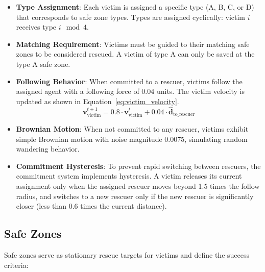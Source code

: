 \documentclass[11pt,a4paper]{article}
\begin{document}
\begin{itemize}
    \item \textbf{Type Assignment}: Each victim is assigned a specific type (A, B, C, or D) that corresponds to safe zone types.
    Types are assigned cyclically: victim $i$ receives type $i \mod 4$.

    \item \textbf{Matching Requirement}: Victims must be guided to their matching safe zones to be considered rescued.
    A victim of type A can only be saved at the type A safe zone.

    \item \textbf{Following Behavior}: When committed to a rescuer, victims follow the assigned agent with a following force of 0.04 units.
    The victim velocity is updated as shown in Equation~\ref{eq:victim_velocity}.
    \begin{equation}
    \label{eq:victim_velocity}
    \mathbf{v}_{\text{victim}}^{t+1} = 0.8 \cdot \mathbf{v}_{\text{victim}}^{t} + 0.04 \cdot \hat{\mathbf{d}}_{\text{to\_rescuer}}
    \end{equation}

    \item \textbf{Brownian Motion}: When not committed to any rescuer, victims exhibit simple Brownian motion with noise magnitude 0.0075, simulating random wandering behavior.

    \item \textbf{Commitment Hysteresis}: To prevent rapid switching between rescuers, the commitment system implements hysteresis.
    A victim releases its current assignment only when the assigned rescuer moves beyond 1.5 times the follow radius, and switches to a new rescuer only if the new rescuer is significantly closer (less than 0.6 times the current distance).
\end{itemize}

\subsection{Safe Zones}
\label{subsec:safe_zones}

Safe zones serve as stationary rescue targets for victims and define the success criteria:
\end{document}
